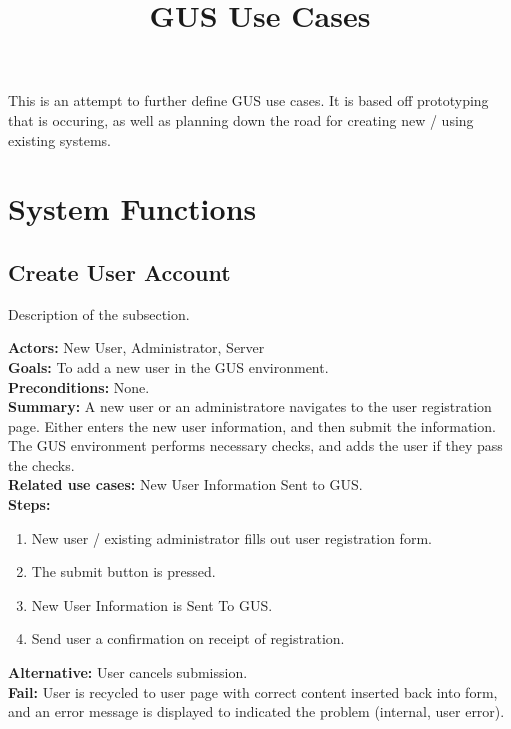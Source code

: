 \documentclass[12pt]{article}
\title{GUS Use Cases}
\date{}
\begin{document}
  \maketitle
  This is an attempt to further define GUS use cases. It is based
  off prototyping that is occuring, as well as planning down the
  road for creating new / using existing systems.
 
\section{System Functions}
 
 \subsection{Create User Account}
 Description of the subsection.
 
 
 \textbf{Actors:} New User, Administrator, Server \\

 
 \textbf{Goals:} To add a new user in the GUS environment. \\
 
 
 \textbf{Preconditions:} None. \\
 
 
 \textbf{Summary:} A new user or an administratore navigates to the user 
			registration page. Either enters the new user 
			information, and then submit the information. The GUS 
			environment performs necessary checks, and adds the 
			user if they pass the checks. \\
 
 
 \textbf{Related use cases:} New User Information Sent to GUS. \\
 
 
 \textbf{Steps:}
\begin{enumerate}
  \item New user / existing administrator fills out user registration form.
  \item The submit button is pressed.
  \item New User Information is Sent To GUS.
  \item Send user a confirmation on receipt of registration.
\end{enumerate}
   
   
 \textbf{Alternative:} User cancels submission. \\
  
  
 \textbf{Fail:} User is recycled to user page with correct content 
			inserted back into form, and an error message is 
			displayed to indicated the problem (internal, user 
			error). \\
\end{document}
